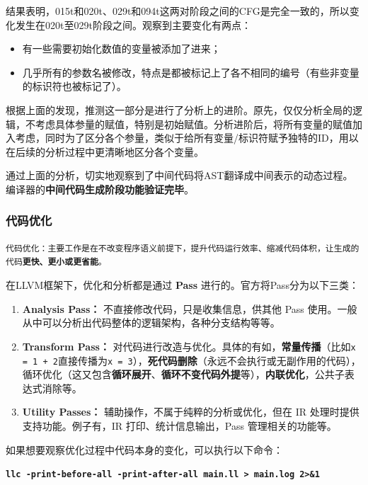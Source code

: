 \documentclass[UTF8,a4paper,10pt]{ctexart}
\begin{document}
结果表明，015t和020t、029t和094t这两对阶段之间的CFG是完全一致的，所以变化发生在020t至029t阶段之间。观察到主要变化有两点：
\begin{itemize}
    \item 有一些需要初始化数值的变量被添加了进来；
    \item 几乎所有的参数名被修改，特点是都被标记上了各不相同的编号（有些非变量的标识符也被标记了）。
\end{itemize}

根据上面的发现，推测这一部分是进行了分析上的进阶。原先，仅仅分析全局的逻辑，不考虑具体参量的赋值，特别是初始赋值。分析进阶后，将所有变量的赋值加入考虑，同时为了区分各个参量，类似于给所有变量/标识符赋予独特的ID，用以在后续的分析过程中更清晰地区分各个变量。

\vspace{1em}

通过上面的分析，切实地观察到了中间代码将AST翻译成中间表示的动态过程。编译器的\textbf{中间代码生成阶段功能验证完毕}。

\subsubsection{代码优化}
\texttt{\large{代码优化：主要工作是在不改变程序语义前提下，提升代码运行效率、缩减代码体积，让生成的代码\textbf{更快、更小或更省能}。}}

\vspace{1em}

在LLVM框架下，优化和分析都是通过 \textbf{Pass }进行的。官方将Pass分为以下三类：
\begin{enumerate}
    \item \textbf{Analysis Pass：} 不直接修改代码，只是收集信息，供其他 Pass 使用。一般从中可以分析出代码整体的逻辑架构，各种分支结构等等。
    \item \textbf{Transform Pass：} 对代码进行改造与优化。具体的有如，\textbf{常量传播}（比如\texttt{x = 1 + 2}直接传播为\texttt{x = 3}），\textbf{死代码删除}（永远不会执行或无副作用的代码），循环优化（这又包含\textbf{循环展开}、\textbf{循环不变代码外提}等），\textbf{内联优化}，公共子表达式消除等。
    \item \textbf{Utility Passes：} 辅助操作，不属于纯粹的分析或优化，但在 IR 处理时提供支持功能。例子有，IR 打印、统计信息输出，Pass 管理相关的功能等。
\end{enumerate}

如果想要观察优化过程中代码本身的变化，可以执行以下命令：
\begin{center}
    \textcolor{deepblue}{\textbf{\texttt{\large{llc -print-before-all -print-after-all main.ll > main.log 2>\&1}}}}
\end{center}
\end{document}

